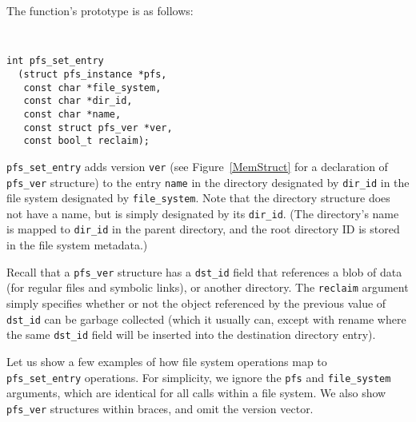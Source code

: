 The function's prototype is as follows:

\begin{center}
{\tt \small
\begin{verbatim}
int pfs_set_entry 
  (struct pfs_instance *pfs,
   const char *file_system,
   const char *dir_id,
   const char *name,
   const struct pfs_ver *ver,
   const bool_t reclaim);
\end{verbatim}
}
\end{center}

{\tt pfs\_set\_entry} adds version {\tt ver} (see
Figure~\ref{MemStruct} for a declaration of {\tt pfs\_ver} structure)
to the entry {\tt name} in the directory designated by {\tt dir\_id}
in the file system designated by {\tt file\_system}.  Note that the
directory structure does not have a name, but is simply designated by
its {\tt dir\_id}.  (The directory's name is mapped to {\tt dir\_id}
in the parent directory, and the root directory ID is stored in the
file system metadata.)

Recall that a \texttt{pfs\_ver} structure has a \texttt{dst\_id} field
that references a blob of data (for regular files and symbolic links),
or another directory.  The {\tt reclaim} argument simply specifies
whether or not the object referenced by the previous value of
\texttt{dst\_id} can be garbage collected (which it usually can,
except with rename where the same \texttt{dst\_id} field will be
inserted into the destination directory entry).

Let us show a few examples of how file system operations map to {\tt
pfs\_set\_entry} operations.  For simplicity, we ignore the {\tt pfs}
and {\tt file\_system} arguments, which are identical for all calls
within a file system.  We also show \texttt{pfs\_ver} structures
within braces, and omit the version vector.

